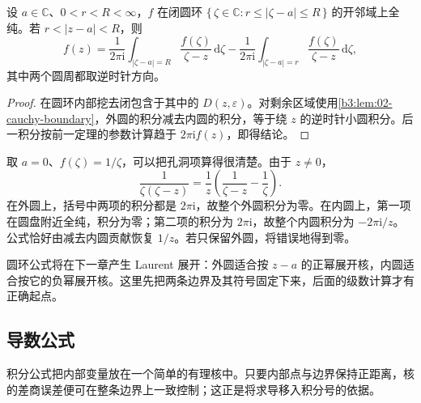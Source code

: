 \begin{proposition}\label{b3:prop:02-annulus-cauchy}
设 \(a\in\mathbb C\)、\(0<r<R<\infty\)，\(f\) 在闭圆环
\(\{\,\zeta\in\mathbb C:r\le|\zeta-a|\le R\,\}\) 的开邻域上全纯。若 \(r<|z-a|<R\)，则
\[
 f(z)=\frac1{2\pi\mathrm{i}}\int_{|\zeta-a|=R}
       \frac{f(\zeta)}{\zeta-z}\,\mathrm{d}\zeta
       -\frac1{2\pi\mathrm{i}}\int_{|\zeta-a|=r}
       \frac{f(\zeta)}{\zeta-z}\,\mathrm{d}\zeta,
\]
其中两个圆周都取逆时针方向。
\end{proposition}
\begin{proof}
在圆环内部挖去闭包含于其中的 \(D(z,\varepsilon)\)。对剩余区域使用\cref{b3:lem:02-cauchy-boundary}，外圆的积分减去内圆的积分，等于绕 \(z\) 的逆时针小圆积分。后一积分按前一定理的参数计算趋于 \(2\pi\mathrm{i}f(z)\)，即得结论。
\end{proof}

取 \(a=0\)、\(f(\zeta)=1/\zeta\)，可以把孔洞项算得很清楚。由于 \(z\ne0\)，
\[
 \frac1{\zeta(\zeta-z)}
 =\frac1z\left(\frac1{\zeta-z}-\frac1\zeta\right).
\]
在外圆上，括号中两项的积分都是 \(2\pi\mathrm{i}\)，故整个外圆积分为零。在内圆上，第一项在圆盘附近全纯，积分为零；第二项的积分为 \(2\pi\mathrm{i}\)，故整个内圆积分为 \(-2\pi\mathrm{i}/z\)。公式恰好由减去内圆贡献恢复 \(1/z\)。若只保留外圆，将错误地得到零。

\ProseParagraphBreak

圆环公式将在下一章产生 Laurent 展开：外圆适合按 \(z-a\) 的正幂展开核，内圆适合按它的负幂展开核。这里先把两条边界及其符号固定下来，后面的级数计算才有正确起点。

\subsection{导数公式}
\label{b3:subsec:020302}

积分公式把内部变量放在一个简单的有理核中。只要内部点与边界保持正距离，核的差商误差便可在整条边界上一致控制；这正是将求导移入积分号的依据。

